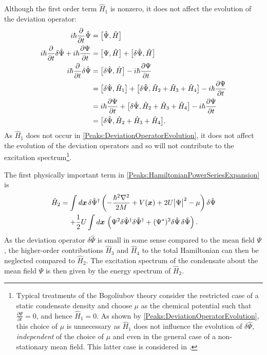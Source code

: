 Although the first order term $\hat{H}_1$ is nonzero, it does not affect the evolution of the deviation operator:
\begin{align}
    i \hbar \frac{\partial }{\partial t}\hat{\Psi} &= \comm{\hat{\Psi}, \hat{H}}\\
    i \hbar \frac{\partial }{\partial t}\delta{\hat{\Psi}} + i \hbar \frac{\partial \Psi}{\partial t} &= \comm{\Psi, \hat{H}} + \comm{\delta\hat{\Psi}, \hat{H}}\\
    i \hbar \frac{\partial }{\partial t}\delta \hat{\Psi} &= \comm{\delta \hat{\Psi}, \hat{H}} - i \hbar \frac{\partial  \Psi}{\partial t}\\
    &= \comm{\delta \hat{\Psi}, \hat{H}_1} + \comm{\delta \hat{\Psi}, \hat{H}_2 + \hat{H}_3 + \hat{H}_4} - i \hbar \frac{\partial\Psi }{\partial t}\\
    &= i \hbar \frac{\partial \Psi}{\partial t} + \comm{\delta \hat{\Psi}, \hat{H}_2 + \hat{H}_3 + \hat{H}_4} - i \hbar \frac{\partial \Psi}{\partial t}\\
    &= \comm{\delta \hat{\Psi}, \hat{H}_2 + \hat{H}_3 + \hat{H}_4}. \label{Peaks:DeviationOperatorEvolution}
\end{align}
As $\hat{H}_1$ does not occur in \eqref{Peaks:DeviationOperatorEvolution}, it does not affect the evolution of the deviation operators and so will not contribute to the excitation spectrum\footnote{Typical treatments of the Bogoliubov theory consider the restricted case of a static condensate density and choose $\mu$ as the chemical potential such that $\displaystyle \frac{\partial \Psi}{\partial t} = 0$, and hence $\hat{H}_1=0$. As shown by \eqref{Peaks:DeviationOperatorEvolution}, this choice of $\mu$ is unnecessary as $\hat{H}_1$ does not influence the evolution of $\delta\hat{\Psi}$, \emph{independent} of the choice of $\mu$ and even in the general case of a non-stationary mean field. This latter case is considered in .}.

The first physically important term in \eqref{Peaks:HamiltonianPowerSeriesExpansion} is
\begin{align}
    \begin{split}
        \hat{H}_2 &= \int d \bm{x}\, \delta \hat{\Psi}^\dagger \left(-\frac{\hbar^2 \nabla^2}{2 M} + V(\bm{x}) + 2 U\big|\Psi\big|^2 -\mu \right)\delta\hat{\Psi}\\
         &\relphantom{=} + \frac{1}{2} U\int d \bm{x}\, \left(\Psi^2 \delta \hat{\Psi}^\dagger\delta \hat{\Psi}^\dagger  +  (\Psi^*)^2 \delta \hat{\Psi} \,\delta \hat{\Psi}\right).
    \end{split}
    \label{Peaks:HamiltonianPowerSeriesQuadraticTerm}
\end{align}
As the deviation operator $\delta \hat{\Psi}$ is small in some sense compared to the mean field $\Psi$, the higher-order contributions $\hat{H}_3$ and $\hat{H}_4$ to the total Hamiltonian can then be neglected compared to $\hat{H}_2$. The excitation spectrum of the condensate about the mean field $\Psi$ is then given by the energy spectrum of $\hat{H}_2$.

